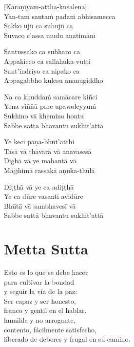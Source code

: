 [Karaṇīyam-attha-kusalena]\\
Yan-taṁ santaṁ padaṁ abhisamecca\\
Sakko ujū ca suhujū ca\\
Suvaco c'assa mudu anatimānī

Santussako ca subharo ca\\
Appakicco ca sallahuka-vutti\\
Sant'indriyo ca nipako ca\\
Appagabbho kulesu ananugiddho

Na ca khuddaṁ samācare kiñci\\
Yena viññū pare upavadeyyuṁ\\
Sukhino vā khemino hontu\\
Sabbe sattā bhavantu sukhit'attā

Ye keci pāṇa-bhūt'atthi\\
Tasā vā thāvarā vā anavasesā\\
Dīghā vā ye mahantā vā\\
Majjhimā rassakā aṇuka-thūlā

Diṭṭhā vā ye ca adiṭṭhā\\
Ye ca dūre vasanti avidūre\\
Bhūtā vā sambhavesī vā\\
Sabbe sattā bhavantu sukhit'attā

\chapter[Metta Sutta]{Metta Sutta}


\begin{leader}
\end{leader}

Esto es lo que se debe hacer\\
para cultivar la bondad\\
y seguir la vía de la paz:\\
Ser capaz y ser honesto,\\
franco y gentil en el hablar.\\
humilde y no arrogante,\\
contento, fácilmente satisfecho,\\
liberado de deberes y frugal en su camino.

